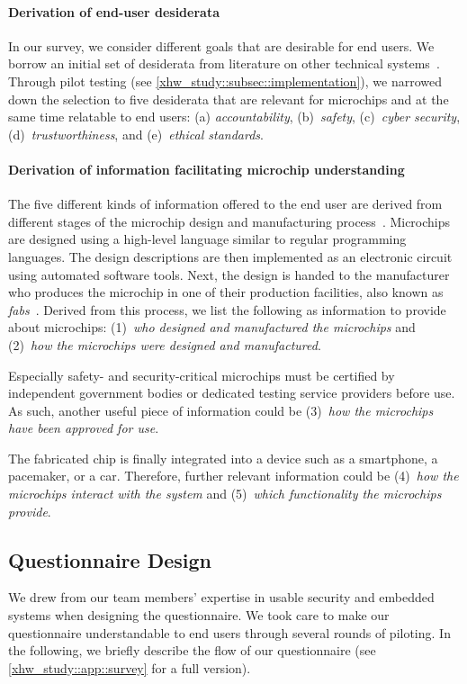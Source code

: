 \paragraph{Derivation of end-user desiderata}
In our survey, we consider different goals that are desirable for end users.
We borrow an initial set of desiderata from literature on other technical systems~\cite{Chazette2021Exploring,Langer2021What,speith2023building}.
Through pilot testing (see \autoref{xhw_study::subsec::implementation}), we narrowed down the selection to five desiderata that are relevant for microchips and at the same time relatable to end users:
(a) \textit{accountability}, (b)~\textit{safety}, (c)~\textit{cyber security}, (d)~\textit{trustworthiness}, and (e)~\textit{ethical standards}.

\paragraph{Derivation of information facilitating microchip understanding}
\label{xhw_study::par::information}
The five different kinds of information offered to the end user are derived from different stages of the microchip design and manufacturing process~\cite{weste2015cmos,lienig2020fundamentals}.
Microchips are designed using a high-level language similar to regular programming languages.
The design descriptions are then implemented as an electronic circuit using automated software tools.
Next, the  design is handed to the manufacturer who produces the microchip in one of their production facilities, also known as \emph{fabs}~\cite{geiger1990vlsi}.
Derived from this process, we list the following as information to provide about microchips: (1)~\textit{who designed and manufactured the microchips} and (2)~\textit{how the microchips were designed and manufactured}.

Especially safety- and security-critical microchips must be certified by independent government bodies or dedicated testing service providers before use. 
As such, another useful piece of information could be (3)~\textit{how the microchips have been approved for use}.

The fabricated chip is finally integrated into a device such as a smartphone, a pacemaker, or a car.
Therefore, further relevant information could be (4)~\textit{how the microchips interact with the system} and (5)~\textit{which functionality the microchips provide}.

\subsection{Questionnaire Design}
\label{xhw_study::subsec::questionnaire}
We drew from our team members' expertise in usable security and embedded systems when designing the questionnaire. 
We took care to make our questionnaire understandable to end users through several rounds of piloting.
In the following, we briefly describe the flow of our questionnaire (see \autoref{xhw_study::app::survey} for a full version).

